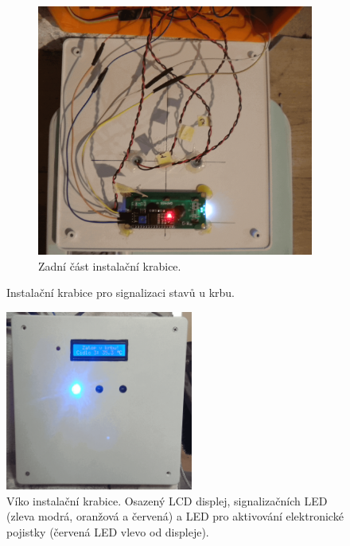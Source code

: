 \begin{figure}[H]
\begin{subfigure}{.5\textwidth}
  \includegraphics[width=\textwidth]{images/krb/zadni-cast-krytu-vika-instalacni-krabice-krb.png}
  \caption{Zadní část instalační krabice.}
  \label{fig:zadni-cast-krytu-vika-instalacni-krabice-krb}
\end{subfigure}
\caption{Instalační krabice pro signalizaci stavů u krbu.}
\label{fig:instalacni-krabice}
\end{figure}



\begin{figure}[H]
    \centering
    \includegraphics[width=0.55\textwidth]{images/krb/predni-cast-krytu-vika-instalacni-krabice-krb.png}
    \caption[Víko instalační krabice pro signalizaci stavů u krbu.]{Víko instalační krabice. Osazený LCD displej, signalizačních LED (zleva modrá, oranžová a červená) a LED pro aktivování elektronické pojistky (červená LED vlevo od displeje).}
    \label{fig:predni-cast-krytu-vika-instalacni-krabice-krb}
\end{figure}


